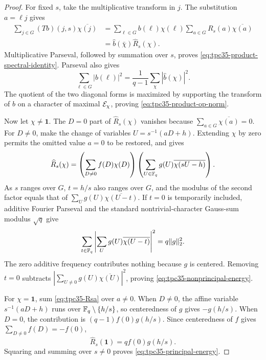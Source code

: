 \begin{proof}
For fixed \(s\), take the multiplicative transform in \(j\).  The
substitution \(a=\ell j\) gives
\begin{align*}
 \sum_{j\in G}(Tb)(j,s)\overline{\chi(j)}
 &=\sum_{\ell\in G}b(\ell)\chi(\ell)
   \sum_{a\in G}R_s(a)\overline{\chi(a)}\\
 &=\widehat b(\bar\chi)\widehat R_s(\chi).
\end{align*}
Multiplicative Parseval, followed by summation over \(s\), proves
\eqref{eq:tpc35-product-spectral-identity}.  Parseval also gives
\[
 \sum_{\ell\in G}|b(\ell)|^2
 =\frac1{q-1}\sum_\chi|\widehat b(\chi)|^2.
\]
The quotient of the two diagonal forms is maximized by supporting the
transform of \(b\) on a character of maximal \(\mathcal E_\chi\), proving
\eqref{eq:tpc35-product-op-norm}.

Now let \(\chi\ne\mathbf1\).  The \(D=0\) part of
\(\widehat R_s(\chi)\) vanishes because
\(\sum_{a\in G}\overline{\chi(a)}=0\).  For \(D\ne0\), make the change
of variables \(U=s^{-1}(aD+h)\).  Extending \(\chi\) by zero permits the
omitted value \(a=0\) to be restored, and gives
\begin{equation}
 \widehat R_s(\chi)
 =\left(\sum_{D\ne0}f(D)\chi(D)\right)
  \left(\sum_{U\in\mathbb F_q}g(U)
  \overline{\chi(sU-h)}\right).
 \label{eq:tpc35-Rhat-factor}
\end{equation}
As \(s\) ranges over \(G\), \(t=h/s\) also ranges over \(G\), and the
modulus of the second factor equals that of
\(
 \sum_Ug(U)\overline{\chi(U-t)}
\).
If \(t=0\) is temporarily included, additive Fourier Parseval and the
standard nontrivial-character Gauss-sum modulus \(\sqrt q\) give
\begin{equation}
 \sum_{t\in\mathbb F_q}
 \left|\sum_Ug(U)\overline{\chi(U-t)}\right|^2
 =q\|g\|_2^2.
 \label{eq:tpc35-shifted-character-energy}
\end{equation}
The zero additive frequency contributes nothing because \(g\) is
centered.  Removing \(t=0\) subtracts
\(
 |\sum_{U\ne0}g(U)\overline{\chi(U)}|^2
\), proving \eqref{eq:tpc35-nonprincipal-energy}.

For \(\chi=\mathbf1\), sum \eqref{eq:tpc35-Rsa} over \(a\ne0\).  When
\(D\ne0\), the affine variable \(s^{-1}(aD+h)\) runs over
\(\mathbb F_q\setminus\{h/s\}\), so centeredness of \(g\) gives
\(-g(h/s)\).  When \(D=0\), the contribution is
\((q-1)f(0)g(h/s)\).  Since centeredness of \(f\) gives
\(\sum_{D\ne0}f(D)=-f(0)\),
\begin{equation}
 \widehat R_s(\mathbf1)=qf(0)g(h/s).
 \label{eq:tpc35-principal-Rhat}
\end{equation}
Squaring and summing over \(s\ne0\) proves
\eqref{eq:tpc35-principal-energy}.
\end{proof}

